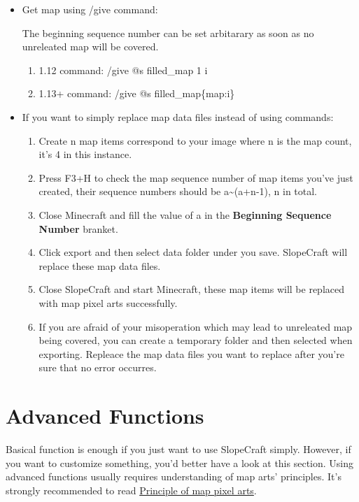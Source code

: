 \documentclass{article}
\begin{document}
   \begin{itemize}
       \item Get map using /give command:
       
       The beginning sequence number can be set arbitarary as soon as no unreleated map will be covered.
       \begin{enumerate}
           \item 1.12 command: /give @s filled\_map 1 i
           \item 1.13+ command: /give @s filled\_map\{map:i\}
       \end{enumerate}
       \item If you want to simply replace map data files instead of using commands:
       \begin{enumerate}
           \item Create n map items correspond to your image where n is the map count, it's 4 in this instance.
           \item Press F3+H to check the map sequence number of map items you've just created, their sequence numbers should be a\textasciitilde(a+n-1), n in total.
           \item Close Minecraft and fill the value of a in the \textbf{Beginning Sequence Number} branket.
           \item Click export and then select data folder under you save. SlopeCraft will replace these map data files. 
           \item Close SlopeCraft and start Minecraft, these map items will be replaced with map pixel arts successfully.
           \item If you are afraid of your misoperation which may lead to unreleated map being covered, you can create a temporary folder and then selected when exporting. Repleace the map data files you want to replace after you're sure that no error occurres.
       \end{enumerate}
   \end{itemize}
   
   \pagebreak
   \section{Advanced Functions}
   Basical function is enough if you just want to use SlopeCraft simply. However, if you want to customize something, you'd better have a look at this section. Using advanced functions usually requires understanding of map arts' principles. It's strongly recommended to read \href{https://github.com/ToKiNoBug/SlopeCraftTutorial/blob/main/BasicPrinciple/Principle%20of%20map%20pixel%20arts.md}{Principle of map pixel arts}.
\end{document}
